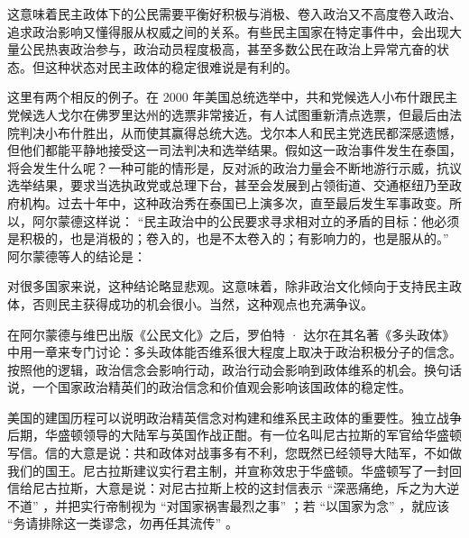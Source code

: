 
这意味着民主政体下的公民需要平衡好积极与消极、卷入政治又不高度卷入政治、追求政治影响又懂得服从权威之间的关系。有些民主国家在特定事件中，会出现大量公民热衷政治参与，政治动员程度极高，甚至多数公民在政治上异常亢奋的状态。但这种状态对民主政体的稳定很难说是有利的。

这里有两个相反的例子。在 2000 年美国总统选举中，共和党候选人小布什跟民主党候选人戈尔在佛罗里达州的选票非常接近，有人试图重新清点选票，但最后由法院判决小布什胜出，从而使其赢得总统大选。戈尔本人和民主党选民都深感遗憾，但他们都能平静地接受这一司法判决和选举结果。假如这一政治事件发生在泰国，将会发生什么呢？一种可能的情形是，反对派的政治力量会不断地游行示威，抗议选举结果，要求当选执政党或总理下台，甚至会发展到占领街道、交通枢纽乃至政府机构。过去十年中，这种政治秀在泰国已上演多次，直至最后发生军事政变。所以，阿尔蒙德这样说： “民主政治中的公民要求寻求相对立的矛盾的目标：他必须是积极的，也是消极的；卷入的，也是不太卷入的；有影响力的，也是服从的。” 阿尔蒙德等人的结论是：


对很多国家来说，这种结论略显悲观。这意味着，除非政治文化倾向于支持民主政体，否则民主获得成功的机会很小。当然，这种观点也充满争议。

在阿尔蒙德与维巴出版《公民文化》之后，罗伯特 · 达尔在其名著《多头政体》中用一章来专门讨论：多头政体能否维系很大程度上取决于政治积极分子的信念。按照他的逻辑，政治信念会影响行动，政治行动会影响到政体维系的机会。换句话说，一个国家政治精英们的政治信念和价值观会影响该国政体的稳定性。

美国的建国历程可以说明政治精英信念对构建和维系民主政体的重要性。独立战争后期，华盛顿领导的大陆军与英国作战正酣。有一位名叫尼古拉斯的军官给华盛顿写信。信的大意是说：共和政体对战事多有不利，您既然已经领导大陆军，不如做我们的国王。尼古拉斯建议实行君主制，并宣称效忠于华盛顿。华盛顿写了一封回信给尼古拉斯，大意是说：对尼古拉斯上校的这封信表示 “深恶痛绝，斥之为大逆不道” ，并把实行帝制视为 “对国家祸害最烈之事” ；若 “以国家为念” ，就应该 “务请排除这一类谬念，勿再任其流传” 。

